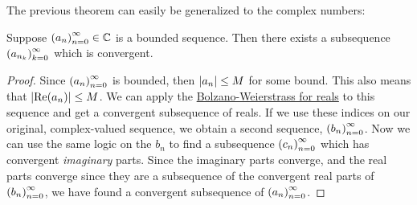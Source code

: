 The previous theorem can easily be generalized to the complex numbers:
\begin{theorem}
Suppose $\seq{a} \in \mathbb{C}$ is a bounded sequence. Then there exists a subsequence $\seq{a}[n_k][k]$ which is convergent. 
\end{theorem}
\begin{proof}
Since $\seq{a}$ is bounded, then $\left\lvert a_n \right\rvert \leq M$ for some bound. This also means that $\left\lvert \operatorname{Re}({a_n}) \right\rvert \leq M$. We can apply the \hyperlink{Bolzano-Weierstrass Theorem, Real-Valued Case}{Bolzano-Weierstrass for reals} to this sequence and get a convergent subsequence of reals. If we use these indices on our original, complex-valued sequence, we obtain a second sequence, $\seq{b}$. Now we can use the same logic on the $b_n$ to find a subsequence $\seq{c}$ which has convergent \emph{imaginary} parts. Since the imaginary parts converge, and the real parts converge since they are a subsequence of the convergent real parts of $\seq{b}$, we have found a convergent subsequence of $\seq{a}$.
\end{proof}
